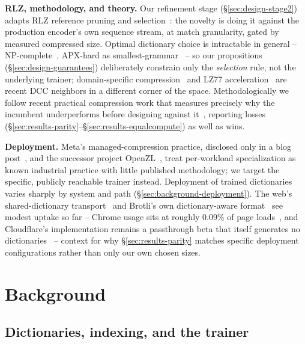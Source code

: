 \documentclass[12pt]{article}
\begin{document}
\textbf{RLZ, methodology, and theory.} Our refinement stage
(\S\ref{sec:design-stage2}) adapts RLZ reference pruning and
selection~\cite{hoobin2011rlz,puglisi2023rlz}: the novelty is doing it
against the production encoder's own sequence stream, at match
granularity, gated by measured compressed size. Optimal dictionary
choice is intractable in general -- NP-complete~\cite{storer1982textual},
APX-hard as smallest-grammar~\cite{charikar2005smallestgrammar,casel2019grammar}
-- so our propositions (\S\ref{sec:design-guarantees}) deliberately
constrain only the \emph{selection} rule, not the underlying trainer;
domain-specific compression~\cite{machete2024} and LZ77
acceleration~\cite{lzhv2025} are recent DCC neighbors in a different
corner of the space. Methodologically we follow
recent practical compression work that measures precisely why the
incumbent underperforms before designing against
it~\cite{boncz2020fsst,afroozeh2024alp}, reporting losses
(\S\ref{sec:results-parity}--\S\ref{sec:results-equalcompute}) as well
as wins.

\textbf{Deployment.} Meta's managed-compression practice, disclosed only
in a blog post~\cite{metaengineering2018zstd}, and the successor project
OpenZL~\cite{openzl}, treat per-workload specialization as known
industrial practice with little published methodology; we target the
specific, publicly reachable trainer instead. Deployment of trained
dictionaries varies sharply by system and path
(\S\ref{sec:background-deployment}). The web's shared-dictionary
transport~\cite{rfc9842} and Brotli's own dictionary-aware
format~\cite{alakuijala2019brotli} see modest uptake so far -- Chrome
usage sits at roughly 0.09\% of page
loads~\cite{chromestatususecounters}, and Cloudflare's implementation
remains a passthrough beta that itself generates no
dictionaries~\cite{cloudflaresharedddict} -- context for why
\S\ref{sec:results-parity} matches specific deployment configurations
rather than only our own chosen sizes.

\section{Background}
\label{sec:background}

\subsection{Dictionaries, indexing, and the trainer}
\label{sec:background-zstd-dicts}
\end{document}
